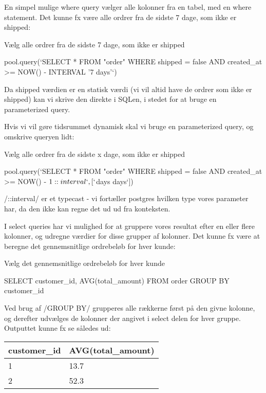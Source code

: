 \documentclass[english,course]{lecture}
\begin{document}
En simpel mulige where query vælger alle kolonner fra en tabel, med en where statement. Det kunne fx være alle ordrer fra de sidste 7 dage, som ikke er shipped:

\begin{listing}[h]
\caption{Vælg alle ordrer fra de sidste 7 dage, som ikke er shipped}
\begin{jscode}
pool.query(`SELECT * FROM "order" WHERE shipped = false AND created_at >= NOW() - INTERVAL '7 days'`)
\end{jscode}
\end{listing}

Da shipped værdien er en statisk værdi (vi vil altid have de ordrer som ikke er shipped) kan vi skrive den direkte i SQLen, i stedet for at bruge en parameterized query. 

Hvis vi vil gøre tidsrummet dynamisk skal vi bruge en parameterized query, og omskrive queryen lidt:

\begin{listing}[h]
\caption{Vælg alle ordrer fra de sidste x dage, som ikke er shipped}
\begin{jscode}
pool.query(`SELECT * FROM "order" WHERE shipped = false AND created_at >= NOW() - $1::interval`, [`${days} days`])
\end{jscode}
\end{listing}

\sqlinline/::interval/ er et typecast  - vi fortæller postgres hvilken type vores parameter har, da den ikke kan regne det ud ud fra konteksten.

I select queries har vi mulighed for at gruppere vores resultat efter en eller flere kolonner, og udregne værdier for disse grupper af kolonner. Det kunne fx være at beregne det gennemsnitlige ordrebeløb for hver kunde:

\begin{listing}[H]
\caption{Vælg det gennemsnitlige ordrebeløb for hver kunde}
\begin{sqlcode}
SELECT customer_id, AVG(total_amount)
FROM order
GROUP BY customer_id
\end{sqlcode}
\end{listing}

Ved brug af \sqlinline/GROUP BY/ grupperes alle rækkerne først på den givne kolonne, og derefter udvælges de kolonner der angivet i select delen for hver gruppe. Outputtet kunne fx se således ud:

\begin{table}[H]
\begin{tabular}{ll}
customer\_id & AVG(total\_amount) \\ \hline
1            & 13.7               \\
2            & 52.3              
\end{tabular}
\end{table}
\end{document}
